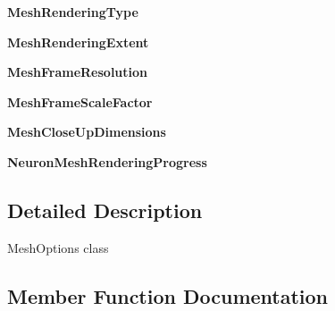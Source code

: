 \begin{DoxyCompactItemize}
\item 
{\bfseries Mesh\+Rendering\+Type}\hypertarget{classui__mesh__panel_1_1MeshOptions_a2d33340dbf5bf7970e12fb7c3db6fc11}{}\label{classui__mesh__panel_1_1MeshOptions_a2d33340dbf5bf7970e12fb7c3db6fc11}

\item 
{\bfseries Mesh\+Rendering\+Extent}\hypertarget{classui__mesh__panel_1_1MeshOptions_a786d0f668a69d322de48c7d7ea640230}{}\label{classui__mesh__panel_1_1MeshOptions_a786d0f668a69d322de48c7d7ea640230}

\item 
{\bfseries Mesh\+Frame\+Resolution}\hypertarget{classui__mesh__panel_1_1MeshOptions_ae3fe1f1721f96122bfd0c7961984b2d4}{}\label{classui__mesh__panel_1_1MeshOptions_ae3fe1f1721f96122bfd0c7961984b2d4}

\item 
{\bfseries Mesh\+Frame\+Scale\+Factor}\hypertarget{classui__mesh__panel_1_1MeshOptions_aecb5fc81998d6bc1cc1c8776f6d148ef}{}\label{classui__mesh__panel_1_1MeshOptions_aecb5fc81998d6bc1cc1c8776f6d148ef}

\item 
{\bfseries Mesh\+Close\+Up\+Dimensions}\hypertarget{classui__mesh__panel_1_1MeshOptions_aeda0eb6153fdf9467a6c171b2044a2f3}{}\label{classui__mesh__panel_1_1MeshOptions_aeda0eb6153fdf9467a6c171b2044a2f3}

\item 
{\bfseries Neuron\+Mesh\+Rendering\+Progress}\hypertarget{classui__mesh__panel_1_1MeshOptions_a19fe84933edcca861cdd2af1fc6b1d44}{}\label{classui__mesh__panel_1_1MeshOptions_a19fe84933edcca861cdd2af1fc6b1d44}

\end{DoxyCompactItemize}


\subsection{Detailed Description}


\begin{DoxyVerb}MeshOptions class\end{DoxyVerb}
 

\subsection{Member Function Documentation}
